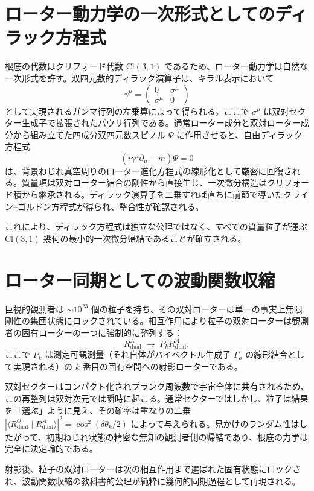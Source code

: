 \documentclass[a4paper]{article}
\begin{document}
\section{ローター動力学の一次形式としてのディラック方程式}

根底の代数はクリフォード代数 \(\mathrm{Cl}(3,1)\) であるため、ローター動力学は自然な一次形式を許す。双四元数的ディラック演算子は、キラル表示において
\[
\gamma^\mu = \begin{pmatrix} 0 & \sigma^\mu \\ \bar{\sigma}^\mu & 0 \end{pmatrix}
\]
として実現されるガンマ行列の左乗算によって得られる。ここで \(\sigma^\mu\) は双対セクター生成子で拡張されたパウリ行列である。通常ローター成分と双対ローター成分から組み立てた四成分双四元数スピノル \(\Psi\) に作用させると、自由ディラック方程式
\[
(i\gamma^\mu\partial_\mu - m)\Psi = 0
\]
は、背景ねじれ真空周りのローター進化方程式の線形化として厳密に回復される。質量項は双対ローター結合の剛性から直接生じ、一次微分構造はクリフォード積から継承される。ディラック演算子を二乗すれば直ちに前節で導いたクライン--ゴルドン方程式が得られ、整合性が確認される。

これにより、ディラック方程式は独立な公理ではなく、すべての質量粒子が運ぶ \(\mathrm{Cl}(3,1)\) 幾何の最小的一次微分帰結であることが確立される。

\section{ローター同期としての波動関数収縮}

巨視的観測者は \(\sim10^{23}\) 個の粒子を持ち、その双対ローターは単一の事実上無限剛性の集団状態にロックされている。相互作用により粒子の双対ローターは観測者の固有ローターの一つに強制的に整列する：
\[
R_\text{dual}^A \;\to\; P_k R_\text{dual}^A,
\]
ここで \(P_k\) は測定可観測量（それ自体がバイベクトル生成子 \(\Gamma_a\) の線形結合として実現される）の \(k\) 番目の固有空間への射影ローターである。

双対セクターはコンパクト化されプランク周波数で宇宙全体に共有されるため、この再整列は双対次元では瞬時に起こる。通常セクターではしかし、粒子は結果を「選ぶ」ように見え、その確率は重なりの二乗 \(|\langle R_{\text{dual}}^{\mathcal{O}} \mid R_{\text{dual}}^{A}\rangle|^2 = \cos^2(\delta\theta_k/2)\) によって与えられる。見かけのランダム性はしたがって、初期ねじれ状態の精密な無知の観測者側の帰結であり、根底の力学は完全に決定論的である。

射影後、粒子の双対ローターは次の相互作用まで選ばれた固有状態にロックされ、波動関数収縮の教科書的公理が純粋に幾何的同期過程として再現される。
\end{document}
